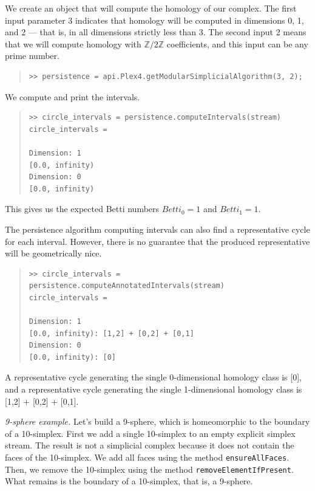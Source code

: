 \documentclass[amscd, amssymb, verbatim]{amsart}[12pt]
\theoremstyle{remark}
\theoremstyle{remark}
\theoremstyle{remark}
\newcommand{\Z}{\mathbb{Z}}
\begin{document}
We create an object that will compute the homology of our complex. The first input parameter 3 indicates that homology will be computed in dimensions 0, 1, and 2 --- that is, in all dimensions strictly less than 3. The second input 2 means that we will compute homology with $\Z/2\Z$ coefficients, and this input can be any prime number.

\begin{quote} \begin{verbatim}
>> persistence = api.Plex4.getModularSimplicialAlgorithm(3, 2);
\end{verbatim} \end{quote}

We compute and print the intervals.

\begin{quote} \begin{verbatim}
>> circle_intervals = persistence.computeIntervals(stream)
circle_intervals =

Dimension: 1
[0.0, infinity)
Dimension: 0
[0.0, infinity)
\end{verbatim} \end{quote}

This gives us the expected Betti numbers $Betti_0=1$ and $Betti_1=1$.

The persistence algorithm computing intervals can also find a representative cycle for each interval. However, there is no guarantee that the produced representative will be geometrically nice.

\begin{quote} \begin{verbatim}
>> circle_intervals = persistence.computeAnnotatedIntervals(stream)
circle_intervals =

Dimension: 1
[0.0, infinity): [1,2] + [0,2] + [0,1]
Dimension: 0
[0.0, infinity): [0]
\end{verbatim} \end{quote}

A representative cycle generating the single 0-dimensional homology class is [0], and a representative cycle generating the single 1-dimensional homology class is [1,2] + [0,2] + [0,1].

{\em 9-sphere example.} Let's build a 9-sphere, which is homeomorphic to the boundary of a 10-simplex. First we add a single 10-simplex to an empty explicit simplex stream. The result is not a simplicial complex because it does not contain the faces of the 10-simplex. We add all faces using the method \texttt{ensureAllFaces}. Then, we remove the 10-simplex using the method \texttt{removeElementIfPresent}. What remains is the boundary of a 10-simplex, that is, a 9-sphere.
\end{document}
